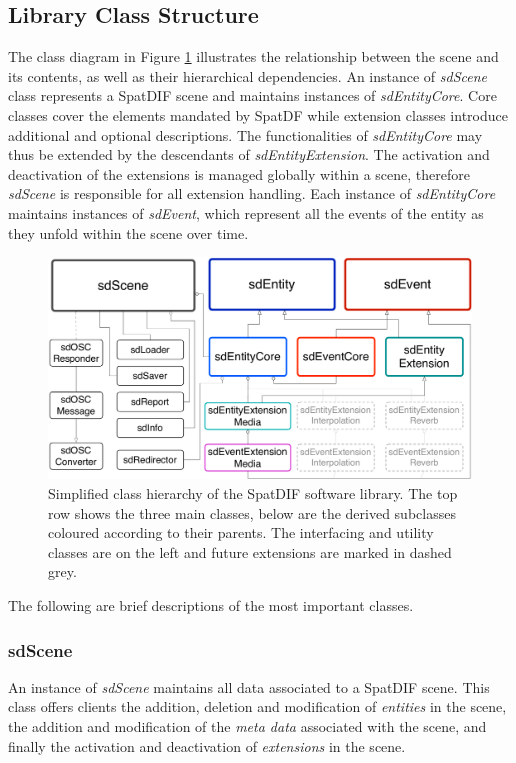 \documentclass{article}
\begin{document}
\subsection{Library Class Structure}\label{subsec:class_structure}

The class diagram in Figure \ref{fig:class_structure} illustrates the relationship between the scene and its contents, as well as their hierarchical dependencies.
An instance of \emph{sdScene} class represents a SpatDIF scene and maintains instances of \emph{sdEntityCore}.
Core classes cover the elements mandated by SpatDF while extension classes introduce additional and optional descriptions.
The functionalities of \emph{sdEntityCore} may thus be extended by the descendants of \emph{sdEntityExtension}. 
The activation and deactivation of the extensions is managed globally within a scene, therefore \emph{sdScene} is responsible for all extension handling.
Each instance of \emph{sdEntityCore} maintains instances of \emph{sdEvent}, which represent all the events of the entity as they unfold within the scene over time.

\begin{figure}[ht!]
	\centering
	\includegraphics[width=\columnwidth]{class_diagram.pdf}
	\caption{Simplified class hierarchy of the SpatDIF software library. The top row shows the three main classes, below are the derived subclasses coloured according to their parents. The interfacing and utility classes are on the left and future extensions are marked in dashed grey.}
	\label{fig:class_structure}
\end{figure}

\vspace{0.5cm}

The following are brief descriptions of the most important classes.

\subsubsection*{sdScene}
An instance of \emph{sdScene} maintains all data associated to a SpatDIF scene.
This class offers clients the addition, deletion and modification of \emph{entities} in the scene, the addition and modification of the \emph{meta data} associated with the scene, and finally the activation and deactivation of \emph{extensions} in the scene.
\end{document}
